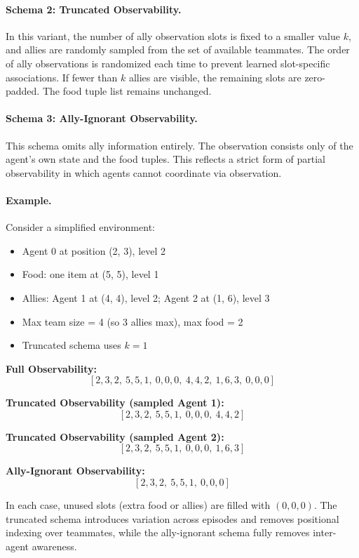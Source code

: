 \paragraph{Schema 2: Truncated Observability.}
In this variant, the number of ally observation slots is fixed to a smaller value \(k\), 
and allies are randomly sampled from the set of available teammates. 
The order of ally observations is randomized each time to prevent learned 
slot-specific associations. If fewer than \(k\) allies are visible, 
the remaining slots are zero-padded. The food tuple list remains unchanged.

\paragraph{Schema 3: Ally-Ignorant Observability.}
This schema omits ally information entirely. 
The observation consists only of the agent's own state and the food tuples. 
This reflects a strict form of partial observability in which agents cannot 
coordinate via observation.

\paragraph{Example.}
Consider a simplified environment:
\begin{itemize}
    \item Agent 0 at position (2, 3), level 2
    \item Food: one item at (5, 5), level 1
    \item Allies: Agent 1 at (4, 4), level 2; Agent 2 at (1, 6), level 3
    \item Max team size = 4 (so 3 allies max), max food = 2
    \item Truncated schema uses \(k = 1\)
\end{itemize}

\textbf{Full Observability:}
\[
[2, 3, 2,\ 5, 5, 1,\ 0, 0, 0,\ 4, 4, 2,\ 1, 6, 3,\ 0, 0, 0]
\]

\textbf{Truncated Observability (sampled Agent 1):}
\[
[2, 3, 2,\ 5, 5, 1,\ 0, 0, 0,\ 4, 4, 2]
\]

\textbf{Truncated Observability (sampled Agent 2):}
\[
[2, 3, 2,\ 5, 5, 1,\ 0, 0, 0,\ 1, 6, 3]
\]

\textbf{Ally-Ignorant Observability:}
\[
[2, 3, 2,\ 5, 5, 1,\ 0, 0, 0]
\]

\noindent In each case, unused slots (extra food or allies) are filled with \((0, 0, 0)\). 
The truncated schema introduces variation across episodes and removes positional 
indexing over teammates, while the ally-ignorant schema fully removes inter-agent awareness.

